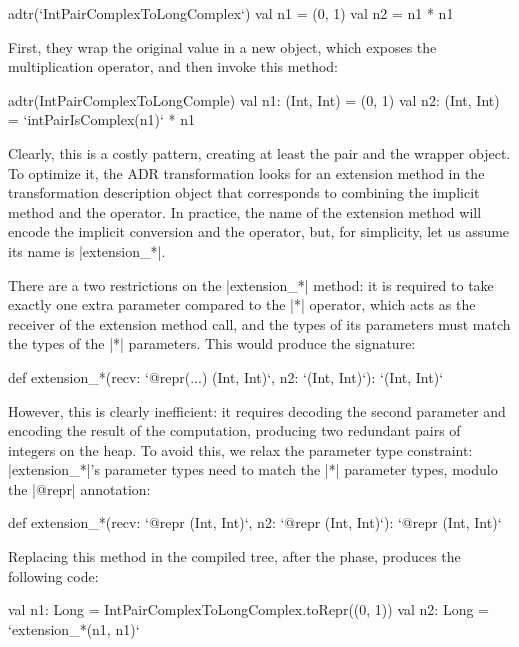 \begin{lstlisting-nobreak}
adtr(`IntPairComplexToLongComplex`) {
  val n1 = (0, 1)
  val n2 = n1 * n1
}
\end{lstlisting-nobreak}

First, they wrap the original value in a new object, which exposes the multiplication operator, and then invoke this method:

\begin{lstlisting-nobreak}
adtr(IntPairComplexToLongComple) {
  val n1: (Int, Int) = (0, 1)
  val n2: (Int, Int) = `intPairIsComplex(n1)` * n1
}
\end{lstlisting-nobreak}

Clearly, this is a costly pattern, creating at least the pair and the wrapper object. To optimize it, the ADR transformation looks for an extension method in the transformation description object that corresponds to combining the implicit method and the operator. In practice, the name of the extension method will encode the implicit conversion and the operator, but, for simplicity, let us assume its name is |extension_*|.

There are a two restrictions on the |extension_*| method: it is required to take exactly one extra parameter compared to the |*| operator, which acts as the receiver of the extension method call, and the types of its parameters must match the types of the |*| parameters. This would produce the signature:

\begin{lstlisting-nobreak}
def extension_*(recv: `@repr(...) (Int, Int)`, n2: `(Int, Int)`): `(Int, Int)`
\end{lstlisting-nobreak}

However, this is clearly inefficient: it requires decoding the second parameter and encoding the result of the computation, producing two redundant pairs of integers on the heap. To avoid this, we relax the parameter type constraint: |extension_*|'s parameter types need to match the |*| parameter types, modulo the |@repr| annotation:

\begin{lstlisting-nobreak}
def extension_*(recv: `@repr (Int, Int)`,  n2: `@repr (Int, Int)`): `@repr (Int, Int)`
\end{lstlisting-nobreak}

Replacing this method in the compiled tree, after the \commit{} phase, produces the following code:

\begin{lstlisting-nobreak}
val n1: Long = IntPairComplexToLongComplex.toRepr((0, 1))
val n2: Long = `extension_*(n1, n1)`
\end{lstlisting-nobreak}

